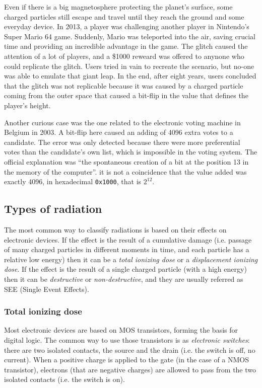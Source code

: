 Even if there is a big magnetosphere protecting the planet's surface, some charged particles still escape and travel until they reach the ground and some everyday device. In 2013, a player was challenging another player in Nintendo's Super Mario 64 game. Suddenly, Mario was teleported into the air, saving crucial time and providing an incredible advantage in the game. The glitch caused the attention of a lot of players, and a \$1000 reweard was offered to anynone who could replicate the glitch. Users tried in vain to recreate the scenario, but no-one was able to emulate that giant leap. In the end, after eight years, users concluded that the glitch was not replicable because it was caused by a charged particle coming from the outer space that caused a bit-flip in the value that defines the player's height. \bigskip

Another curious case was the one related to the electronic voting machine in Belgium in 2003. A bit-flip here caused an adding of 4096 extra votes to a candidate. The error was only detected because there were more preferential votes than the candidate's own list, which is impossible in the voting system. The official explanation was ``the spontaneous creation of a bit at the position 13 in the memory of the computer''. it is not a coincidence that the value added was exactly 4096, in hexadecimal \texttt{0x1000}, that is $2^{12}$.

\subsection{Types of radiation}
The most common way to classify radiations is based on their effects on electronic devices. If the effect is the result of a cumulative damage (i.e. passage of many charged particles in different moments in time, and each particle has a relative low energy) then it can be a \textit{total ionizing dose} or a \textit{displacement ionizing dose}. If the effect is the result of a single charged particle (with a high energy) then it can be \textit{destructive} or \textit{non-destructive}, and they are usually referred as SEE (Single Event Effects). \bigskip

\subsubsection{Total ionizing dose}
Most electronic devices are based on MOS transistors, forming the basis for digital logic. The common way to use those transistors is as \textit{electronic switches}: there are two isolated contacts, the source and the drain (i.e. the switch is off, no current). When a positive charge is applied to the gate (in the case of a NMOS transistor), electrons (that are negative charges) are allowed to pass from the two isolated contacts (i.e. the switch is on). \bigskip

